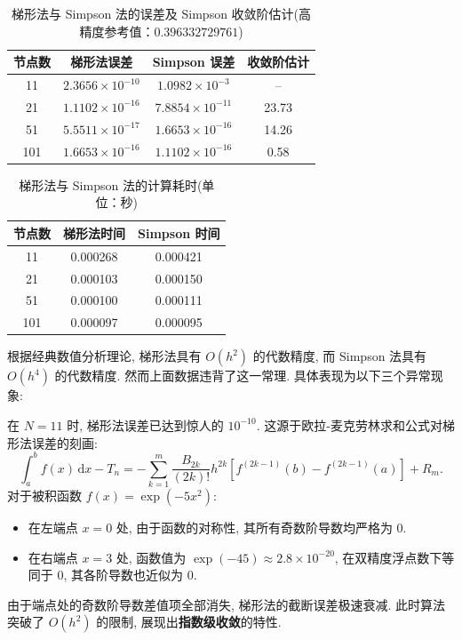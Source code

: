 \documentclass[zihao=-4,a4paper]{ctexart}
\begin{document}

\begin{table}[H]
\centering
\caption{梯形法与 Simpson 法的误差及 Simpson 收敛阶估计(高精度参考值：$0.396332729761$)}
\label{tab:error_convergence}
\small
\begin{tabular}{cccc}
\hline
节点数 & 梯形法误差 & Simpson 误差 & 收敛阶估计 \\
\hline
11  & $2.3656\times10^{-10}$ & $1.0982\times10^{-3}$  & -- \\
21  & $1.1102\times10^{-16}$ & $7.8854\times10^{-11}$ & 23.73 \\
51  & $5.5511\times10^{-17}$ & $1.6653\times10^{-16}$ & 14.26 \\
101 & $1.6653\times10^{-16}$ & $1.1102\times10^{-16}$ & 0.58 \\
\hline
\end{tabular}
\end{table}

\begin{table}[H]
\centering
\caption{梯形法与 Simpson 法的计算耗时(单位：秒)}
\label{tab:time}
\small
\begin{tabular}{ccc}
\hline
节点数 & 梯形法时间 & Simpson 时间 \\
\hline
11  & 0.000268 & 0.000421 \\
21  & 0.000103 & 0.000150 \\
51  & 0.000100 & 0.000111 \\
101 & 0.000097 & 0.000095 \\
\hline
\end{tabular}
\end{table}

根据经典数值分析理论, 梯形法具有 $O(h^2)$ 的代数精度, 而 Simpson 法具有 $O(h^4)$ 的代数精度. 然而上面数据违背了这一常理. 具体表现为以下三个异常现象: 


在 $N=11$ 时, 梯形法误差已达到惊人的 $10^{-10}$. 这源于欧拉-麦克劳林求和公式对梯形法误差的刻画: 
\begin{equation}
    \int_{a}^{b} f(x) \,\mathrm{d} x - T_n = -\sum_{k=1}^{m} \frac{B_{2k}}{(2k)!} h^{2k} \left[ f^{(2k-1)}(b) - f^{(2k-1)}(a) \right] + R_m.
\end{equation}
对于被积函数 $f(x) = \exp(-5x^2)$: 
\begin{itemize}
    \item 在左端点 $x=0$ 处, 由于函数的对称性, 其所有奇数阶导数均严格为 0. 
    \item 在右端点 $x=3$ 处, 函数值为 $\exp(-45) \approx 2.8 \times 10^{-20}$, 在双精度浮点数下等同于 0, 其各阶导数也近似为 0. 
\end{itemize}
由于端点处的奇数阶导数差值项全部消失, 梯形法的截断误差极速衰减. 此时算法突破了 $O(h^2)$ 的限制, 展现出\textbf{指数级收敛}的特性. 
\end{document}
